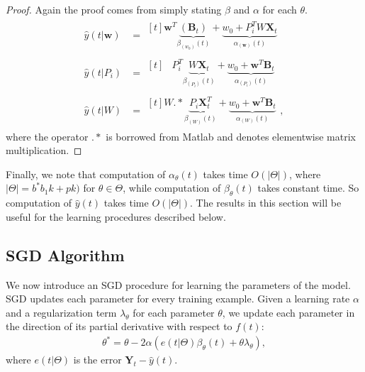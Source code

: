 \documentclass[10pt]{proc}
\newtheorem{proof}{Proof}
\begin{document}
\begin{proof}
    Again the proof comes from simply stating $\beta$ and $\alpha$ for each
    $\theta$.
    \begin{align}
        \hat{y}(t | \bm{w}) &= \begin{aligned}[t]  \label{eq:decomp-w}
            \bm{w}^T \underbrace{(\bm{B}_t)}_{\beta_{(w_0)}(t)} +
            \underbrace{
                w_0 + P_i^T W \bm{X}_t
            }_{\alpha_{(\bm{w})}(t)}
        \end{aligned} \\
        \hat{y}(t | P_i) &= \begin{aligned}[t]  \label{eq:decomp-P_i}
            & P_i^T \underbrace{
                W \bm{X}_t
            }_{\beta_{(P_i)}(t)} +
            \underbrace{
                w_0 + \bm{w}^T \bm{B}_t
            }_{\alpha_{(P_i)}(t)}
        \end{aligned} \\
        \hat{y}(t | W) &= \begin{aligned}[t]  \label{eq:decomp-W}
            W \mathrel{.*} \underbrace{
                P_i \bm{X}_t^T
            }_{\beta_{(W)}(t)} +
            \underbrace{
                w_0 + \bm{w}^T \bm{B}_t
            }_{\alpha_{(W)}(t)}
        \end{aligned},
    \end{align}
%
    where the operator $\mathrel{.*}$ is borrowed from Matlab and denotes
    elementwise matrix multiplication.
\end{proof}

Finally, we note that computation of $\alpha_\theta(t)$ takes time
$O(|\Theta|)$, where $|\Theta| = b^* b_1 k + pk)$ for $\theta \in \Theta$, while
computation of $\beta_\theta(t)$ takes constant time. So computation of
$\hat{y}(t)$ takes time $O(|\Theta|)$. The results in this section will be
useful for the learning procedures described below.


\subsection{SGD Algorithm}

We now introduce an SGD procedure for learning the parameters of the model. SGD
updates each parameter for every training example. Given a learning rate
$\alpha$ and a regularization term $\lambda_\theta$ for each parameter $\theta$,
we update each parameter in the direction of its partial derivative with respect
to $f(t)$:
%
\begin{align}
    \theta^* =
        \theta - 2\alpha \left(
            e(t | \Theta) \beta_\theta(t) + \theta\lambda_\theta
        \right),
\end{align}
%
where $e(t | \Theta)$ is the error $\bm{Y}_t - \hat{y}(t)$.
\end{document}
